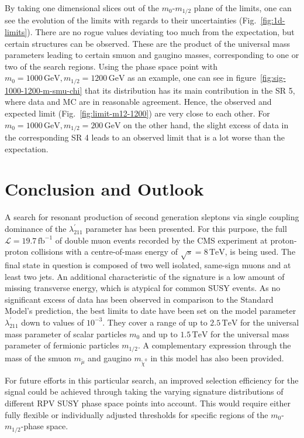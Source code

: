 By taking one dimensional slices out of the $m_0$-$m_{1/2}$ plane of the limits, one can see the evolution of the limits with regards to their uncertainties (Fig.~\ref{fig:1d-limits}). There are no rogue values deviating too much from the expectation, but certain structures can be observed. These are the product of the universal mass parameters leading to certain smuon and gaugino masses, corresponding to one or two of the search regions. Using the phase space point with $m_0 = 1000\,\text{GeV}, m_{1/2} = 1200\,\text{GeV}$ as an example, one can see in figure~\ref{fig:sig-1000-1200-m-smu-chi} that its distribution has its main contribution in the SR 5, where data and MC are in reasonable agreement. Hence, the observed and expected limit (Fig.~\ref{fig:limit-m12-1200}) are very close to each other. For $m_0 = 1000\,\text{GeV}, m_{1/2} = 200\,\text{GeV}$ on the other hand, the slight excess of data in the corresponding SR 4 leads to an observed limit that is a lot worse than the expectation.

\section{Conclusion and Outlook}
\label{sec:conclusion}

A search for resonant production of second generation sleptons via single coupling dominance of the $\lambda^{\prime}_{211}$ parameter has been presented. For this purpose, the full $\mathcal{L} = 19.7\,\text{fb}^{-1}$ of double muon events recorded by the CMS experiment at proton-proton collisions with a centre-of-mass energy of $\sqrt{s} = 8\,\text{TeV}$, is being used. The final state in question is composed of two well isolated, same-sign muons and at least two jets. An additional characteristic of the signature is a low amount of missing transverse energy, which is atypical for common SUSY events. As no significant excess of data has been observed in comparison to the Standard Model's prediction, the best limits to date have been set on the model parameter $\lambda^{\prime}_{211}$ down to values of $10^{-3}$. They cover a range of up to $2.5\,\text{TeV}$ for the universal mass parameter of scalar particles $m_0$ and up to $1.5\,\text{TeV}$ for the universal mass parameter of fermionic particles $m_{1/2}$. A complementary expression through the mass of the smuon $m_{\tilde{\mu}}$ and gaugino $m_{\tilde{\chi}^0}$ in this model has also been provided.

For future efforts in this particular search, an improved selection efficiency for the signal could be achieved through taking the varying signature distributions of different RPV SUSY phase space points into account. This would require either fully flexible or individually adjusted thresholds for specific regions of the $m_0$-$m_{1/2}$-phase space.

